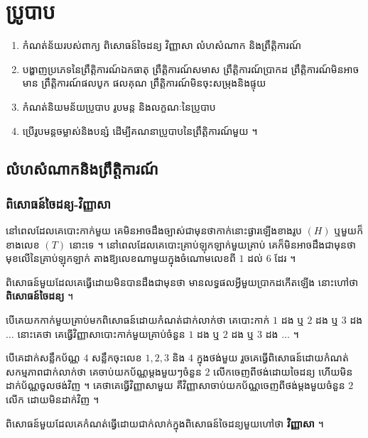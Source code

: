 \chapter{ប្រូបាប}

\begin{objBox}[វត្ថុបំណង]
\begin{enumerate}[1]
  \item កំណត់ន័យរបស់ពាក្យ ពិសោធន៍ចៃដន្យ វិញ្ញាសា លំហសំណាក និងព្រឹត្តិការណ៍
  \item បង្ហាញប្រភេទនៃព្រឹត្តិការណ៍ឯកធាតុ ព្រឹត្តិការណ៍សមាស ព្រឹត្តិការណ៍ប្រាកដ ព្រឹត្តិការណ៍មិនអាចមាន ព្រឹត្តិការណ៍ផលបូក ផលគុណ ព្រឹត្តិការណ៍មិនចុះសម្រុងនិងផ្ទុយ
  \item កំណត់និយមន័យប្រូបាប រូបមន្ត និងលក្ខណៈនៃប្រូបាប
  \item ប្រើរូបមន្តចម្លាស់និងបន្សំ ដើម្បីគណនាប្រូបាបនៃព្រឹត្តិការណ៍មួយ ។
\end{enumerate}
\end{objBox}

\section{លំហសំណាកនិងព្រឹត្តិការណ៍}
\subsection{ពិសោធន៍ចៃដន្យ-វិញ្ញាសា}

\begin{example}[ឧទាហរណ៍ ១]
នៅពេលដែលគេបោះកាក់មួយ គេមិនអាចដឹងច្បាស់ជាមុនថាកាក់នោះផ្ងារឡើងខាងរូប $(H)$ ឬមួយក៏ខាងលេខ $(T)$ នោះទេ ។ នៅពេលដែលគេបោះគ្រាប់ឡុកឡាក់មួយគ្រាប់ គេក៏មិនអាចដឹងជាមុនថាមុខលើនៃគ្រាប់ឡុកឡាក់ តាងឱ្យលេខណាមួយក្នុងចំណោមលេខពី $1$ ដល់ $6$ ដែរ ។
\end{example}
ពិសោធន៍មួយដែលគេធ្វើដោយមិនបានដឹងជាមុនថា មានលទ្ធផលអ្វីមួយប្រាកដកើតឡើង នោះហៅថា \textbf{ពិសោធន៍ចៃដន្យ} ។

\begin{example}[ឧទាហរណ៍ ២]
បើគេយកកាក់មួយគ្រាប់មកពិសោធន៍ដោយកំណត់ជាក់លាក់ថា គេបោះកាក់ $1$ ដង ឬ $2$ ដង ឬ $3$ ដង $\dots$ នោះគេថា គេធ្វើវិញ្ញាសាបោះកាក់មួយគ្រាប់ចំនួន $1$ ដង ឬ $2$ ដង ឬ $3$ ដង $\dots$ ។
\end{example}

\begin{example}[ឧទាហរណ៍ ៣]
បើគេដាក់សន្លឹកប័ណ្ណ $4$ សន្លឹកចុះលេខ $1, 2, 3$ និង $4$ ក្នុងថង់មួយ រួចគេធ្វើពិសោធន៍ដោយកំណត់សកម្មភាពជាក់លាក់ថា គេចាប់យកប័ណ្ណម្ដងមួយៗចំនួន $2$ លើកចេញពីថង់ដោយចៃដន្យ ហើយមិនដាក់ប័ណ្ណចូលថង់វិញ ។ គេថាគេធ្វើវិញ្ញាសាមួយ គឺវិញ្ញាសាចាប់យកប័ណ្ណចេញពីថង់ម្ដងមួយចំនួន $2$ លើក ដោយមិនដាក់វិញ ។
\end{example}
ពិសោធន៍មួយដែលគេកំណត់ធ្វើដោយជាក់លាក់ក្នុងពិសោធន៍ចៃដន្យមួយហៅថា \textbf{វិញ្ញាសា} ។

